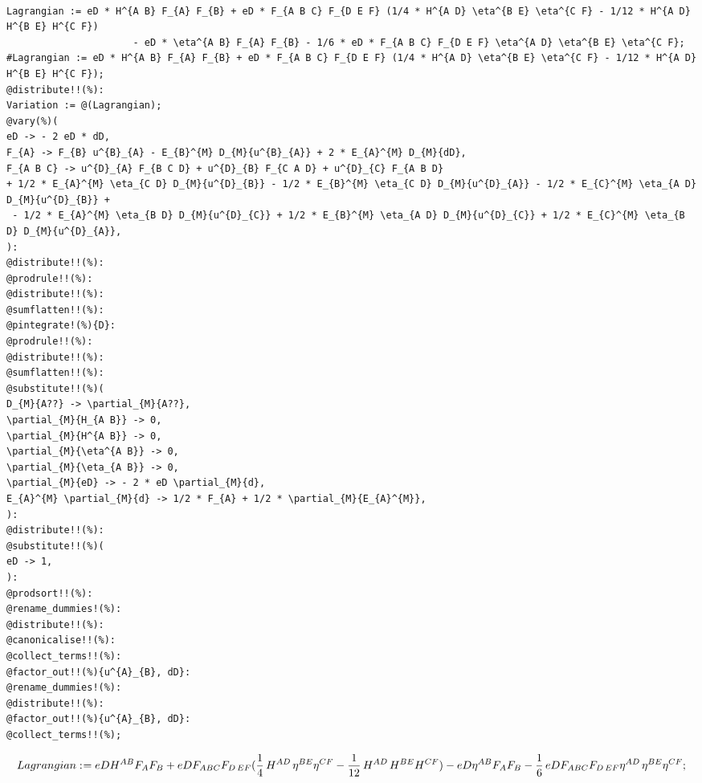 \documentclass[11pt]{article}
\def\specialcolon{\mathrel{\mathop{:}}\hspace{-.5em}}
\begin{document}
\\
{\color[named]{Blue}\begin{verbatim}
Lagrangian := eD * H^{A B} F_{A} F_{B} + eD * F_{A B C} F_{D E F} (1/4 * H^{A D} \eta^{B E} \eta^{C F} - 1/12 * H^{A D} H^{B E} H^{C F})
                      - eD * \eta^{A B} F_{A} F_{B} - 1/6 * eD * F_{A B C} F_{D E F} \eta^{A D} \eta^{B E} \eta^{C F};
#Lagrangian := eD * H^{A B} F_{A} F_{B} + eD * F_{A B C} F_{D E F} (1/4 * H^{A D} \eta^{B E} \eta^{C F} - 1/12 * H^{A D} H^{B E} H^{C F});
@distribute!!(%):
Variation := @(Lagrangian);
@vary(%)(
eD -> - 2 eD * dD,
F_{A} -> F_{B} u^{B}_{A} - E_{B}^{M} D_{M}{u^{B}_{A}} + 2 * E_{A}^{M} D_{M}{dD},
F_{A B C} -> u^{D}_{A} F_{B C D} + u^{D}_{B} F_{C A D} + u^{D}_{C} F_{A B D} 
+ 1/2 * E_{A}^{M} \eta_{C D} D_{M}{u^{D}_{B}} - 1/2 * E_{B}^{M} \eta_{C D} D_{M}{u^{D}_{A}} - 1/2 * E_{C}^{M} \eta_{A D} D_{M}{u^{D}_{B}} + 
 - 1/2 * E_{A}^{M} \eta_{B D} D_{M}{u^{D}_{C}} + 1/2 * E_{B}^{M} \eta_{A D} D_{M}{u^{D}_{C}} + 1/2 * E_{C}^{M} \eta_{B D} D_{M}{u^{D}_{A}},
):
@distribute!!(%):
@prodrule!!(%):
@distribute!!(%):
@sumflatten!!(%):
@pintegrate!(%){D}:
@prodrule!!(%):
@distribute!!(%):
@sumflatten!!(%):
@substitute!!(%)(
D_{M}{A??} -> \partial_{M}{A??},
\partial_{M}{H_{A B}} -> 0,
\partial_{M}{H^{A B}} -> 0,
\partial_{M}{\eta^{A B}} -> 0,
\partial_{M}{\eta_{A B}} -> 0,
\partial_{M}{eD} -> - 2 * eD \partial_{M}{d},
E_{A}^{M} \partial_{M}{d} -> 1/2 * F_{A} + 1/2 * \partial_{M}{E_{A}^{M}},
):
@distribute!!(%):
@substitute!!(%)(
eD -> 1,
):
@prodsort!!(%):
@rename_dummies!(%):
@distribute!!(%):
@canonicalise!!(%):
@collect_terms!!(%):
@factor_out!!(%){u^{A}_{B}, dD}:
@rename_dummies!(%):
@distribute!!(%):
@factor_out!!(%){u^{A}_{B}, dD}:
@collect_terms!!(%);
\end{verbatim}}
\begin{dmath*}[compact, spread=2pt]
Lagrangian\specialcolon{}= eD {H}^{A B} {F}_{A} {F}_{B} + eD {F}_{A B C} {F}_{D\,  E F} (\frac{1}{4}\, {H}^{A D\, } {\eta}^{B E} {\eta}^{C F} - \frac{1}{12}\, {H}^{A D\, } {H}^{B E} {H}^{C F}) - eD {\eta}^{A B} {F}_{A} {F}_{B} - \frac{1}{6}\, eD {F}_{A B C} {F}_{D\,  E F} {\eta}^{A D\, } {\eta}^{B E} {\eta}^{C F};
\end{dmath*}
\end{document}
